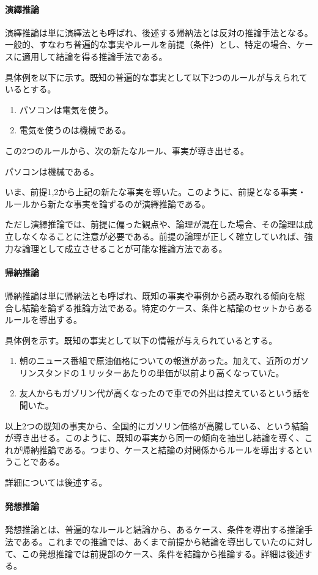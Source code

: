 \documentclass[dvipdfmx]{jsarticle}
\begin{document}
\paragraph{演繹推論}演繹推論は単に演繹法とも呼ばれ、後述する帰納法とは反対の推論手法となる。一般的、すなわち普遍的な事実やルールを前提（条件）とし、特定の場合、ケースに適用して結論を得る推論手法である。\par
具体例を以下に示す。既知の普遍的な事実として以下2つのルールが与えられているとする。
\begin{enumerate}
  \item パソコンは電気を使う。
  \item 電気を使うのは機械である。
\end{enumerate}
この2つのルールから、次の新たなルール、事実が導き出せる。
\begin{center}
  \item パソコンは機械である。
\end{center}
いま、前提1,2から上記の新たな事実を導いた。このように、前提となる事実・ルールから新たな事実を論ずるのが演繹推論である。\par
ただし演繹推論では、前提に偏った観点や、論理が混在した場合、その論理は成立しなくなることに注意が必要である。前提の論理が正しく確立していれば、強力な論理として成立させることが可能な推論方法である。
\paragraph{帰納推論}帰納推論は単に帰納法とも呼ばれ、既知の事実や事例から読み取れる傾向を総合し結論を論ずる推論方法である。特定のケース、条件と結論のセットからあるルールを導出する。\par
具体例を示す。既知の事実として以下の情報が与えられているとする。
\begin{enumerate}
  \item 朝のニュース番組で原油価格についての報道があった。加えて、近所のガソリンスタンドの１リッターあたりの単価が以前より高くなっていた。
  \item 友人からもガゾリン代が高くなったので車での外出は控えているという話を聞いた。
\end{enumerate}
以上2つの既知の事実から、全国的にガソリン価格が高騰している、という結論が導き出せる。このように、既知の事実から同一の傾向を抽出し結論を導く、これが帰納推論である。つまり、ケースと結論の対関係からルールを導出するということである。\par
詳細については後述する。
\paragraph{発想推論}発想推論とは、普遍的なルールと結論から、あるケース、条件を導出する推論手法である。これまでの推論では、あくまで前提から結論を導出していたのに対して、この発想推論では前提部のケース、条件を結論から推論する。詳細は後述する。
\end{document}
